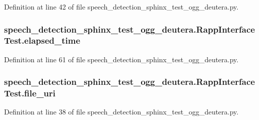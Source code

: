 Definition at line 42 of file speech\-\_\-detection\-\_\-sphinx\-\_\-test\-\_\-ogg\-\_\-deutera.\-py.

\hypertarget{classspeech__detection__sphinx__test__ogg__deutera_1_1RappInterfaceTest_a876679bcc4ed3a4459d014b86f1f16eb}{
\subsubsection[{elapsed\-\_\-time}]{\setlength{\rightskip}{0pt plus 5cm}speech\-\_\-detection\-\_\-sphinx\-\_\-test\-\_\-ogg\-\_\-deutera.\-Rapp\-Interface\-Test.\-elapsed\-\_\-time}}\label{classspeech__detection__sphinx__test__ogg__deutera_1_1RappInterfaceTest_a876679bcc4ed3a4459d014b86f1f16eb}


Definition at line 61 of file speech\-\_\-detection\-\_\-sphinx\-\_\-test\-\_\-ogg\-\_\-deutera.\-py.

\hypertarget{classspeech__detection__sphinx__test__ogg__deutera_1_1RappInterfaceTest_a01c21452c62b10a81447aba823f2ae23}{
\subsubsection[{file\-\_\-uri}]{\setlength{\rightskip}{0pt plus 5cm}speech\-\_\-detection\-\_\-sphinx\-\_\-test\-\_\-ogg\-\_\-deutera.\-Rapp\-Interface\-Test.\-file\-\_\-uri}}\label{classspeech__detection__sphinx__test__ogg__deutera_1_1RappInterfaceTest_a01c21452c62b10a81447aba823f2ae23}


Definition at line 38 of file speech\-\_\-detection\-\_\-sphinx\-\_\-test\-\_\-ogg\-\_\-deutera.\-py.


